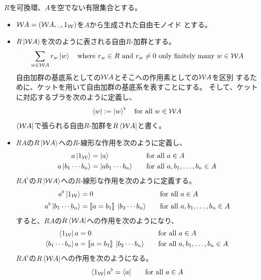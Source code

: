 {	$R$を可換環、$A$を空でない有限集合とする。
	\begin{itemize}\setlength{\itemsep}{-1mm} %
		\item $\W A=(\W A, \myspace, 1_\W)$を$A$から生成された自由モノイド
		とする。
		\item $R\mathinner{|{{\ensuremath{{\mathcal{W}}}}A}\rangle}$を次のように表される自由$R$-加群とする。
		\begin{equation*}\begin{split}
			\sum_{w\in{\ensuremath{{\mathcal{W}}}} A} r_w\mathinner{|{w}\rangle} \quad\text{where } r_w\in R
			\text{ and } r_w\neq 0 \text{ only finitely many } w\in {\ensuremath{{\mathcal{W}}}} A
		\end{split}\end{equation*}
		自由加群の基底系としての${{\mathcal{W}}} A$とそこへの作用素としての${{\mathcal{W}}} A$を区別
		するために、ケットを用いて自由加群の基底系を表すことにする。
		そして、ケットに対応するブラを次のように定義し、
		\begin{equation*}\begin{split}
			\mathinner{\langle{w}|} := \mathinner{|{w}\rangle}^\flat \quad\text{for all } w\in{\ensuremath{{\mathcal{W}}}} A
		\end{split}\end{equation*}
		$\mathinner{\langle{{\ensuremath{{\mathcal{W}}}}A}|}$で張られる自由$R$-加群を$R\mathinner{\langle{{\ensuremath{{\mathcal{W}}}}A}|}$と書く。
		\item $RA$の$R\mathinner{|{{\ensuremath{{\mathcal{W}}}}A}\rangle}$への$R$-線形な作用を次のように定義し、
		\begin{alignat*}{2}
			a\mathinner{|{1_{\ensuremath{{\mathcal{W}}}}}\rangle} &= \mathinner{|{a}\rangle} &\quad& \text{for all } a\in A \\
			a\mathinner{|{b_1\cdots b_n}\rangle} &= \mathinner{|{ab_1\cdots b_n}\rangle} &\quad& \text{for all } 
			a, b_1, \dots, b_n\in A
		\end{alignat*}
		$RA^\flat$の$R\mathinner{|{{\ensuremath{{\mathcal{W}}}}A}\rangle}$への$R$-線形な作用を次のように定義する。
		\begin{alignat*}{2}
			a^\flat\mathinner{|{1_{\ensuremath{{\mathcal{W}}}}}\rangle} &= 0 &\quad& \text{for all } a\in A \\
			a^\flat\mathinner{|{b_1\cdots b_n}\rangle} &= [\![a=b_1]\!]\; \mathinner{|{b_2\cdots b_n}\rangle} 
			&\quad& \text{for all } a, b_1, \dots, b_n\in A
		\end{alignat*}
		すると、$RA$の$R\mathinner{\langle{{\ensuremath{{\mathcal{W}}}}A}|}$への作用を次のようになり、
		\begin{alignat*}{2}
			\mathinner{\langle{1_{\ensuremath{{\mathcal{W}}}}}|}a &= 0 &\quad& \text{for all } a\in A \\
			\mathinner{\langle{b_1\cdots b_n}|}a &= [\![a=b_1]\!]\;\mathinner{|{b_2\cdots b_n}\rangle} &\quad& 
			\text{for all } a, b_1, \dots, b_n\in A
		\end{alignat*}
		$RA^\flat$の$R\mathinner{\langle{{\ensuremath{{\mathcal{W}}}}A}|}$への作用を次のようになる。
		\begin{alignat*}{2}
			\bra{1_\W}a^\flat &= \bra{a} &\quad& \text{for all } a\in A \\

\end{alignat*}
\end{itemize}}
